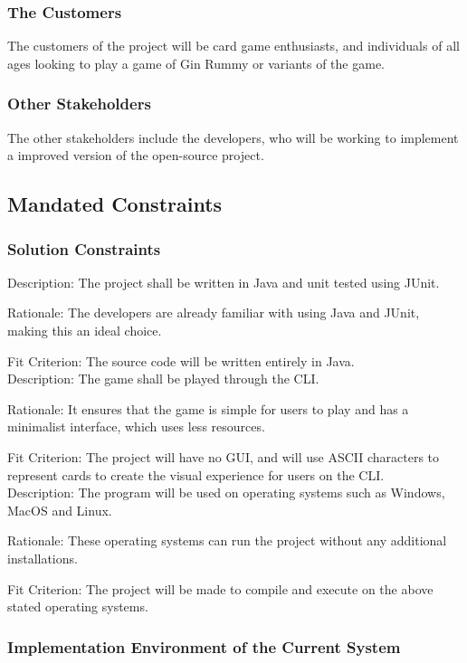 \documentclass[12pt, titlepage]{article}
\begin{document}
\subsubsection{The Customers}
The customers of the project will be card game enthusiasts, and individuals of all ages looking to play a game of Gin Rummy or variants of the game.

\subsubsection{Other Stakeholders}
The other stakeholders include the developers, who will be working to implement a improved version of the open-source project.
\subsection{Mandated Constraints}

\subsubsection{Solution Constraints}
\noindent Description: The project shall be written in Java and unit tested using JUnit.

\noindent Rationale: The developers are already familiar with using Java and JUnit, making this an ideal choice.

\noindent Fit Criterion: The source code will be written entirely in Java. \\

\noindent Description: The game shall be played through the CLI.

\noindent Rationale: It ensures that the game is simple for users to play and has a minimalist interface, which uses less resources.

\noindent Fit Criterion: The project will have no GUI, and will use ASCII characters to represent cards to create the visual experience for users on the CLI. \\

\noindent Description: The program will be used on operating systems such as Windows, MacOS and Linux.

Rationale: These operating systems can run the project without any additional installations.

Fit Criterion: The project will be made to compile and execute on the above stated operating systems. \\

\subsubsection{Implementation Environment of the Current System}
\end{document}
